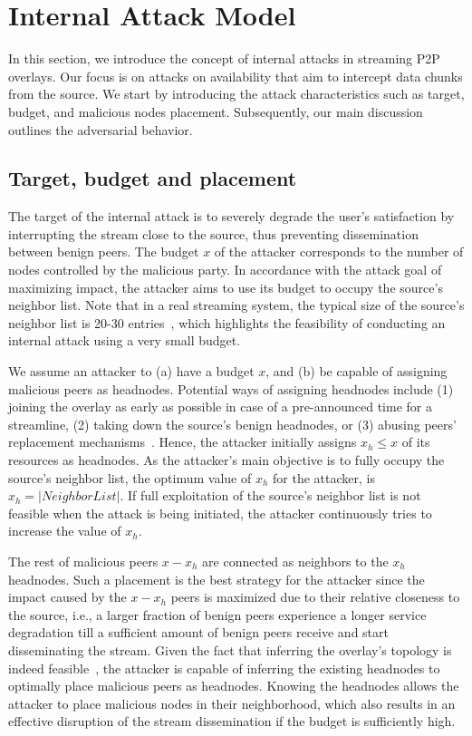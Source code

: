 \section{Internal Attack Model}
\label{sec:Attack}

In this section, we introduce the concept of internal attacks in streaming P2P overlays.
Our focus is on attacks on availability that aim to intercept data chunks from the source. 
We start by introducing the attack characteristics such as target, budget, and malicious nodes placement. 
Subsequently, our main discussion outlines the \drop adversarial behavior. 

\subsection{Target, budget and placement}


The target of the internal attack is to severely degrade the user's satisfaction by interrupting the stream close to the source, thus preventing dissemination between benign peers.
The budget $x$ of the attacker corresponds to the number of nodes controlled by the malicious party. 
In accordance with the attack goal of maximizing impact, the attacker aims to use its budget to occupy the source's neighbor list. 
Note that in a real streaming system, the typical size of the source's neighbor list is 20-30 entries~\cite{neighborlist1,neighborlist2}, which highlights the feasibility of conducting an internal attack using a very small budget.


We assume an attacker to (a) have a budget $x$, and (b) be capable of assigning malicious peers as headnodes.
Potential ways of assigning headnodes include (1) joining the overlay as early as possible in case of a pre-announced time for a streamline, (2) taking down the source's benign headnodes, or (3) abusing peers' replacement mechanisms~\cite{nguyen2016swap}.
Hence, the attacker initially assigns $x_h \leq x$ of its resources as headnodes.
As the attacker's main objective is to fully occupy the source's neighbor list, the optimum value of $x_h$ for the attacker, is $x_h = |NeighborList|$.
If full exploitation of the source's neighbor list is not feasible when the attack is being initiated, the attacker continuously tries to increase the value of $x_h$.  

The rest of malicious peers $x-x_h$ are connected as neighbors to the $x_h$ headnodes. 
Such a placement is the best strategy for the attacker since the impact caused by the $x-x_h$ peers is maximized due to their relative closeness to the source, i.e., a larger fraction of benign peers experience a longer service degradation till a sufficient amount of benign peers receive and start disseminating the stream.
Given the fact that inferring the overlay's topology is indeed feasible~\cite{nguyen2016swap,rbcs}, the attacker is capable of inferring the existing headnodes to optimally place malicious peers as headnodes. Knowing the headnodes allows the attacker to place malicious nodes in their neighborhood, which also results in an effective disruption of the stream dissemination if the budget is sufficiently high. 




